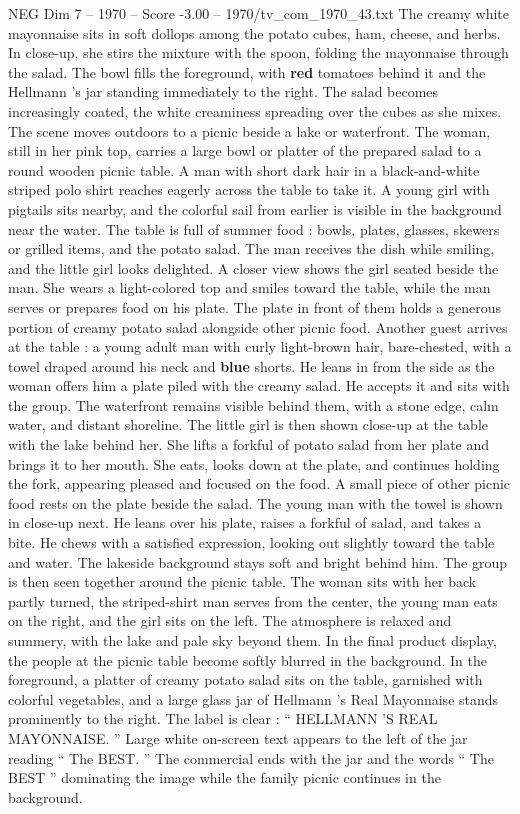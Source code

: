 \begin{textsample}{NEG Dim 7 – 1970 – Score -3.00 – 1970/tv\_com\_1970\_43.txt}
The creamy white mayonnaise sits in soft dollops among the potato cubes, ham, cheese, and herbs.
In close-up, she stirs the mixture with the spoon, folding the mayonnaise through the salad.
The bowl fills the foreground, with \textbf{red} tomatoes behind it and the Hellmann ’s jar standing immediately to the right.
The salad becomes increasingly coated, the white creaminess spreading over the cubes as she mixes.
The scene moves outdoors to a picnic beside a lake or waterfront.
The woman, still in her pink top, carries a large bowl or platter of the prepared salad to a round wooden picnic table.
A man with short dark hair in a black-and-white striped polo shirt reaches eagerly across the table to take it.
A young girl with pigtails sits nearby, and the colorful sail from earlier is visible in the background near the water.
The table is full of summer food : bowls, plates, glasses, skewers or grilled items, and the potato salad.
The man receives the dish while smiling, and the little girl looks delighted.
A closer view shows the girl seated beside the man.
She wears a light-colored top and smiles toward the table, while the man serves or prepares food on his plate.
The plate in front of them holds a generous portion of creamy potato salad alongside other picnic food.
Another guest arrives at the table : a young adult man with curly light-brown hair, bare-chested, with a towel draped around his neck and \textbf{blue} shorts.
He leans in from the side as the woman offers him a plate piled with the creamy salad.
He accepts it and sits with the group.
The waterfront remains visible behind them, with a stone edge, calm water, and distant shoreline.
The little girl is then shown close-up at the table with the lake behind her.
She lifts a forkful of potato salad from her plate and brings it to her mouth.
She eats, looks down at the plate, and continues holding the fork, appearing pleased and focused on the food.
A small piece of other picnic food rests on the plate beside the salad.
The young man with the towel is shown in close-up next.
He leans over his plate, raises a forkful of salad, and takes a bite.
He chews with a satisfied expression, looking out slightly toward the table and water.
The lakeside background stays soft and bright behind him.
The group is then seen together around the picnic table.
The woman sits with her back partly turned, the striped-shirt man serves from the center, the young man eats on the right, and the girl sits on the left.
The atmosphere is relaxed and summery, with the lake and pale sky beyond them.
In the final product display, the people at the picnic table become softly blurred in the background.
In the foreground, a platter of creamy potato salad sits on the table, garnished with colorful vegetables, and a large glass jar of Hellmann ’s Real Mayonnaise stands prominently to the right.
The label is clear : “ HELLMANN ’S REAL MAYONNAISE. ” Large white on-screen text appears to the left of the jar reading “ The BEST. ” The commercial ends with the jar and the words “ The BEST ” dominating the image while the family picnic continues in the background.

\end{textsample}

